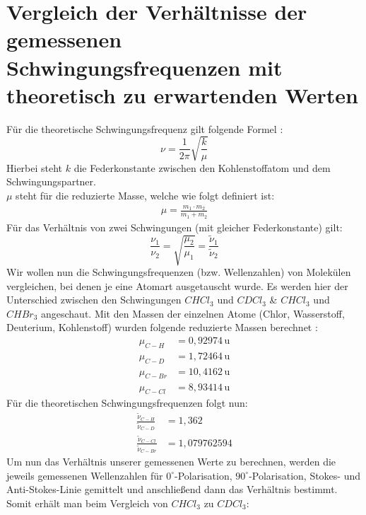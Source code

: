 \section{Vergleich der Verhältnisse der gemessenen Schwingungsfrequenzen mit theoretisch zu erwartenden Werten}
Für die theoretische Schwingungsfrequenz gilt folgende Formel \citep[vgl.][]{Schwingungsfrequenz}:
\begin{equation}
    \nu=\frac{1}{2\pi}\sqrt{\frac{k}{\mu}}
\end{equation}
Hierbei steht $k$ die Federkonstante zwischen den Kohlenstoffatom und dem Schwingungspartner.\\
$\mu$ steht für die reduzierte Masse, welche wie folgt definiert ist:
\begin{align}
    \mu =\frac{m_1\cdot m_2}{m_1+m_2}
\end{align}
Für das Verhältnis von zwei Schwingungen (mit gleicher Federkonstante) gilt:
\begin{equation}
    \frac{\nu_1}{\nu_2}=\sqrt{\frac{\mu_2}{\mu_1}}=\frac{\tilde{\nu}_1}{\tilde{\nu}_2}
\end{equation}
Wir wollen nun die Schwingungsfrequenzen (bzw. Wellenzahlen) von Molekülen vergleichen, bei denen je eine Atomart ausgetauscht wurde.
Es werden hier der Unterschied zwischen den Schwingungen $CHCl_3$ und $CDCl_3$ \& $CHCl_3$ und $CHBr_3$ angeschaut.
Mit den Massen der einzelnen Atome (Chlor, Wasserstoff, Deuterium, Kohlenstoff) wurden folgende reduzierte Massen berechnet \citep[vgl.][]{Massen}:
\begin{align}
    \mu_{C-H}&=0,92974\,\text{u}\\
    \mu_{C-D}&=1,72464\,\text{u}\\
    \mu_{C-Br}&=10,4162\,\text{u}\\
    \mu_{C-Cl}&=8,93414\,\text{u}
\end{align}
Für die theoretischen Schwingungsfrequenzen folgt nun:
\begin{align}
    \frac{\tilde{\nu}_{C-H}}{\tilde{\nu}_{C-D}}&=1,362\\
    \frac{\tilde{\nu}_{C-Cl}}{\tilde{\nu}_{C-Br}}&=1,079762594
\end{align}
Um nun das Verhältnis unserer gemessenen Werte zu berechnen, werden die jeweils gemessenen Wellenzahlen für $0^\circ$-Polarisation, $90^\circ$-Polarisation, Stokes- und Anti-Stokes-Linie gemittelt und anschließend dann das Verhältnis bestimmt.\\
Somit erhält man beim Vergleich von $CHCl_3$ zu $CDCl_3$:
